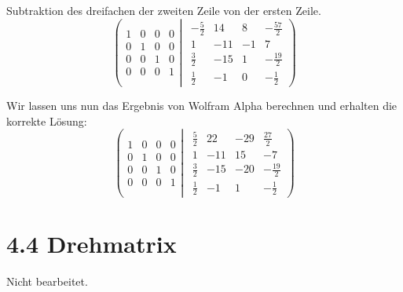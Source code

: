 \documentclass[a4paper,german,12pt,smallheadings]{scrartcl}
\begin{document}
Subtraktion des dreifachen der zweiten Zeile von der ersten Zeile.
\begin{equation*}
\left(
 \begin{matrix}
 1 & 0 & 0 & 0 \\
 0 & 1 & 0 & 0 \\
 0 & 0 & 1 & 0 \\
 0 & 0 & 0 & 1
 \end{matrix}
 \left|
  \hspace{5pt}
  \begin{matrix}
  -\frac{5}{2} & 14 & 8 & -\frac{57}{2} \\
  1 & -11 & -1 & 7 \\
  \frac{3}{2} & -15 & 1 & -\frac{19}{2} \\
  \frac{1}{2} & -1 & 0 & -\frac{1}{2}
  \end{matrix}
 \right)
\right.
\end{equation*}

Wir lassen uns nun das Ergebnis von Wolfram Alpha berechnen und erhalten die korrekte Lösung:
\begin{equation*}
\left(
 \begin{matrix}
 1 & 0 & 0 & 0 \\
 0 & 1 & 0 & 0 \\
 0 & 0 & 1 & 0 \\
 0 & 0 & 0 & 1
 \end{matrix}
 \left|
  \hspace{5pt}
  \begin{matrix}
    \frac{5}{2} & 22 & -29 & \frac{27}{2} \\
     1 & -11 & 15 & -7 \\
     \frac{3}{2} & -15 & -20 & -\frac{19}{2} \\
     \frac{1}{2} & -1 & 1 & -\frac{1}{2}
  \end{matrix}
 \right)
\right.
\end{equation*}

\section*{4.4 Drehmatrix}

Nicht bearbeitet.
\end{document}
